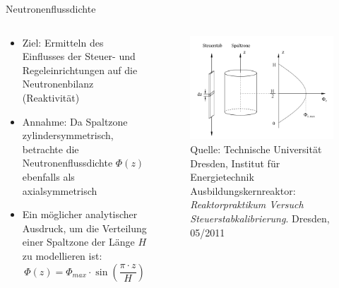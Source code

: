 \documentclass[10pt]{beamer}
\begin{document}
		\begin{frame}{Neutronenflussdichte}
			\begin{columns}
				\begin{column}[c]{0.6\linewidth}
					\begin{itemize}
						\item Ziel: Ermitteln des Einflusses der Steuer- und Regeleinrichtungen auf die Neutronenbilanz (Reaktivität)
						\item Annahme: Da Spaltzone zylindersymmetrisch, betrachte die Neutronenflussdichte $\Phi(z)$ ebenfalls als axialsymmetrisch
						\item Ein möglicher analytischer Ausdruck, um die Verteilung einer Spaltzone der Länge $H$ zu modellieren ist:
							\begin{equation*}
								\Phi(z) = \Phi_{max} \cdot \sin\left(\frac{\pi\cdot z}{H}\right)
							\end{equation*}
					\end{itemize}	
				\end{column}
												
				\begin{column}[c]{0.4\linewidth}
					\begin{figure}[ht]
						\centering
						\includegraphics[width=\textwidth]{pic/NeutrFlDichte}\\
						\tiny{Quelle: Technische Universität Dresden,  Institut für Energietechnik Ausbildungskernreaktor: \textit{Reaktorpraktikum Versuch \glqq Steuerstabkalibrierung\grqq}. Dresden, 05/2011}
					\end{figure}
				\end{column}
     		\end{columns}
 		\end{frame}
 		
\end{document}
